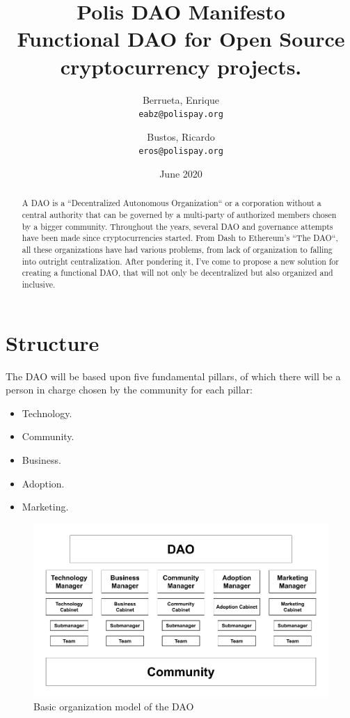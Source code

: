 \documentclass{article}
\title{%
  Polis DAO Manifesto \\
  \large Functional DAO for Open Source cryptocurrency projects.}
\author{
  Berrueta, Enrique\\
  \texttt{eabz@polispay.org}
  \and
  Bustos, Ricardo\\
  \texttt{eros@polispay.org}
}
\date{June 2020}
\begin{document}
\maketitle

	\begin{abstract}
    A DAO is a ``Decentralized Autonomous Organization`` or a corporation without a central authority that can be governed by a multi-party of authorized members chosen by a bigger community. Throughout the years, several DAO and governance attempts have been made since cryptocurrencies started. From Dash to Ethereum's ``The DAO``, all these organizations have had various problems, from lack of organization to falling into outright centralization. After pondering it, I've come to propose a new solution for creating a functional DAO, that will not only be decentralized but also organized and inclusive.
	\end{abstract}

\newpage

\tableofcontents


\newpage

\section{Structure}

The DAO will be based upon five fundamental pillars, of which there will be a person in charge chosen by the community for each pillar:

\begin{itemize}
  \item Technology.
  \item Community.
  \item Business.
  \item Adoption.
  \item Marketing.
\end{itemize}

\begin{figure}[h]
\includegraphics[scale=0.4]{img/dao_structure_en.png}
\centering
\caption{Basic organization model of the DAO}
\end{figure}
\end{document}
